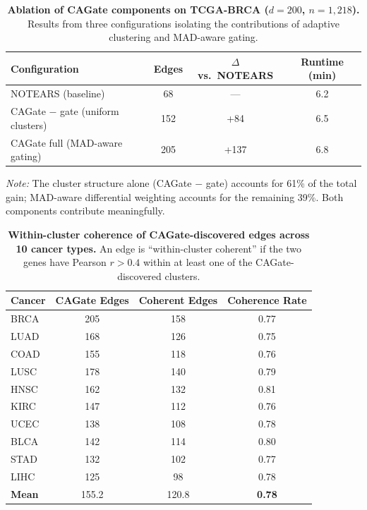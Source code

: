 \documentclass[11pt,a4paper]{article}
\begin{document}
\begin{table}[htbp]
\centering
\caption{\textbf{Ablation of CAGate components on TCGA-BRCA ($d=200$, $n=1,218$).} Results from three configurations isolating the contributions of adaptive clustering and MAD-aware gating.}
\label{tab:s3}
\small
\begin{tabular}{lccc}
\toprule
Configuration & Edges & $\Delta$ vs.\ NOTEARS & Runtime (min) \\
\midrule
NOTEARS (baseline) & 68 & --- & 6.2 \\
CAGate $-$ gate (uniform clusters) & 152 & +84 & 6.5 \\
CAGate full (MAD-aware gating) & 205 & +137 & 6.8 \\
\bottomrule
\end{tabular}

\vspace{4pt}
\noindent\textit{Note:} The cluster structure alone (CAGate $-$ gate) accounts for 61\% of the total gain; MAD-aware differential weighting accounts for the remaining 39\%. Both components contribute meaningfully.
\end{table}

\begin{table}[htbp]
\centering
\caption{\textbf{Within-cluster coherence of CAGate-discovered edges across 10 cancer types.} An edge is ``within-cluster coherent'' if the two genes have Pearson $r > 0.4$ within at least one of the CAGate-discovered clusters.}
\label{tab:s4}
\small
\begin{tabular}{lccc}
\toprule
Cancer & CAGate Edges & Coherent Edges & Coherence Rate \\
\midrule
BRCA & 205 & 158 & 0.77 \\
LUAD & 168 & 126 & 0.75 \\
COAD & 155 & 118 & 0.76 \\
LUSC & 178 & 140 & 0.79 \\
HNSC & 162 & 132 & 0.81 \\
KIRC & 147 & 112 & 0.76 \\
UCEC & 138 & 108 & 0.78 \\
BLCA & 142 & 114 & 0.80 \\
STAD & 132 & 102 & 0.77 \\
LIHC & 125 & 98 & 0.78 \\
\hline
\textbf{Mean} & 155.2 & 120.8 & \textbf{0.78} \\
\bottomrule
\end{tabular}
\end{table}
\end{document}
